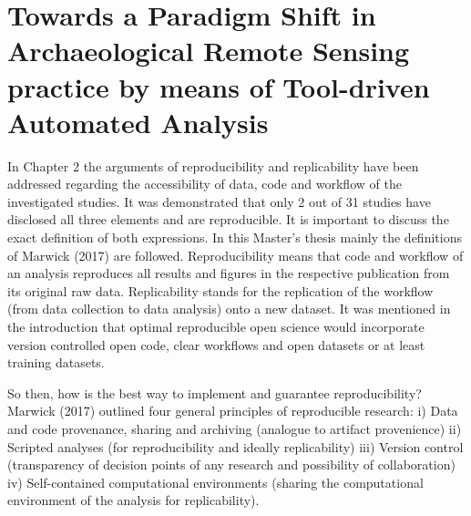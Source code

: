 \documentclass[
  12pt,
]{article}
\begin{document}
\newpage

\vspace{5mm}
\justifying

\hypertarget{towards-a-paradigm-shift-in-archaeological-remote-sensing-practice-by-means-of-tool-driven-automated-analysis}{%
\section{Towards a Paradigm Shift in Archaeological Remote Sensing practice by means of Tool-driven Automated Analysis}\label{towards-a-paradigm-shift-in-archaeological-remote-sensing-practice-by-means-of-tool-driven-automated-analysis}}

In Chapter 2 the arguments of reproducibility and replicability have been addressed regarding the accessibility of data, code and workflow of the investigated studies. It was demonstrated that only 2 out of 31 studies have disclosed all three elements and are reproducible. It is important to discuss the exact definition of both expressions. In this Master's thesis mainly the definitions of Marwick (2017) are followed.
Reproducibility means that code and workflow of an analysis reproduces all results and figures in the respective publication from its original raw data. Replicability stands for the replication of the workflow (from data collection to data analysis) onto a new dataset. It was mentioned in the introduction that optimal reproducible open science would incorporate version controlled open code, clear workflows and open datasets or at least training datasets.

So then, how is the best way to implement and guarantee reproducibility? Marwick (2017) outlined four general principles of reproducible research:
i) Data and code provenance, sharing and archiving (analogue to artifact provenience)
ii) Scripted analyses (for reproducibility and ideally replicability)
iii) Version control (transparency of decision points of any research and possibility of collaboration)
iv) Self-contained computational environments (sharing the computational environment of the analysis for replicability).
\end{document}
